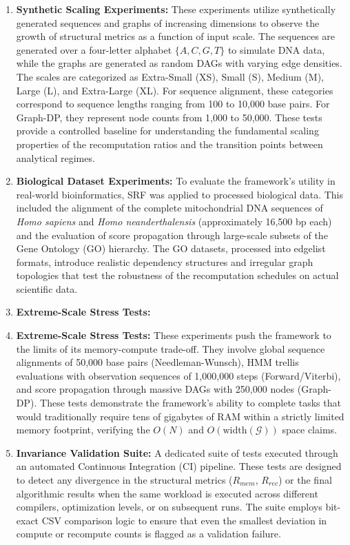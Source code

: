 \begin{enumerate}
    \item \textbf{Synthetic Scaling Experiments:} These experiments utilize synthetically generated sequences and graphs of increasing dimensions to observe the growth of structural metrics as a function of input scale. The sequences are generated over a four-letter alphabet $\{A, C, G, T\}$ to simulate DNA data, while the graphs are generated as random DAGs with varying edge densities. The scales are categorized as Extra-Small (XS), Small (S), Medium (M), Large (L), and Extra-Large (XL). For sequence alignment, these categories correspond to sequence lengths ranging from 100 to 10,000 base pairs. For Graph-DP, they represent node counts from 1,000 to 50,000. These tests provide a controlled baseline for understanding the fundamental scaling properties of the recomputation ratios and the transition points between analytical regimes.
    \item \textbf{Biological Dataset Experiments:} To evaluate the framework's utility in real-world bioinformatics, SRF was applied to processed biological data. This included the alignment of the complete mitochondrial DNA sequences of \textit{Homo sapiens} and \textit{Homo neanderthalensis} (approximately 16,500 bp each) and the evaluation of score propagation through large-scale subsets of the Gene Ontology (GO) hierarchy. The GO datasets, processed into edgelist formats, introduce realistic dependency structures and irregular graph topologies that test the robustness of the recomputation schedules on actual scientific data.
    \item \textbf{Extreme-Scale Stress Tests:}     \item \textbf{Extreme-Scale Stress Tests:} These experiments push the framework to the limits of its memory-compute trade-off. They involve global sequence alignments of 50,000 base pairs (Needleman-Wunsch), HMM trellis evaluations with observation sequences of 1,000,000 steps (Forward/Viterbi), and score propagation through massive DAGs with 250,000 nodes (Graph-DP). These tests demonstrate the framework's ability to complete tasks that would traditionally require tens of gigabytes of RAM within a strictly limited memory footprint, verifying the $O(N)$ and $O(\text{width}(\mathcal{G}))$ space claims.
    \item \textbf{Invariance Validation Suite:} A dedicated suite of tests executed through an automated Continuous Integration (CI) pipeline. These tests are designed to detect any divergence in the structural metrics ($R_{mem}$, $R_{rec}$) or the final algorithmic results when the same workload is executed across different compilers, optimization levels, or on subsequent runs. The suite employs bit-exact CSV comparison logic to ensure that even the smallest deviation in compute or recompute counts is flagged as a validation failure.
\end{enumerate}

